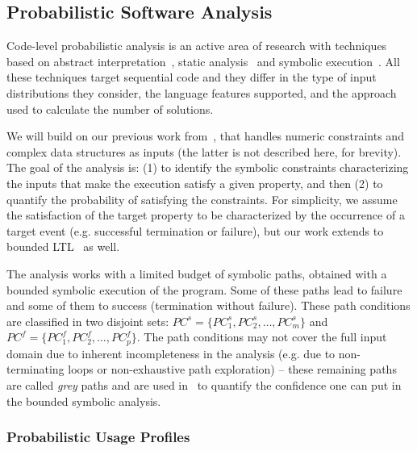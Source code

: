 \subsection{Probabilistic Software Analysis} 
Code-level probabilistic analysis is an active area of research with 
techniques based on abstract interpretation~\cite{Monniaux2000,CousotESOP12}, 
static analysis~\cite{adje-etal-vstte13,Rajamani1,Rajamani2} and symbolic
execution~\cite{ISSTA12,PLDI13}.  All these techniques target 
sequential code and they differ in the type of input
distributions they consider, the language features supported, and
the approach used to calculate the number of solutions.

We will build on our previous work
from~\cite{geldenhuys-etal-issta2012,filieri-etal-icse2013,Borges2014PLDI}, that handles numeric constraints and
complex data structures as inputs (the latter is not described here,
for brevity). The goal of the analysis is: (1) to identify the 
symbolic constraints characterizing the inputs that make the 
execution satisfy a given property, and then (2) to quantify the 
probability of satisfying the constraints.
For simplicity, we assume the satisfaction of the target property to be 
characterized by the occurrence of a target event (e.g. successful 
termination or failure), but our work extends to bounded 
LTL~\cite{Zuliani2010} as well. 


The analysis works with a limited budget of symbolic paths, obtained with a bounded symbolic execution of the program. 
 Some of these paths lead to
failure and some of them to success (termination without failure). 
These path conditions are classified in two disjoint sets: 
$\textit{PC}^s=\{\textit{PC}_1^s, 
\textit{PC}_2^s, \ldots , \textit{PC}_m^s\}$ and
$\textit{PC}^f=\{\textit{PC}_1^f, 
\textit{PC}_2^f, \ldots , \textit{PC}_p^f\}$.
The path conditions 
may not cover the full input domain due to inherent incompleteness in the analysis (e.g. due to non-terminating loops or non-exhaustive path exploration) -- these remaining paths are called  {\em grey} paths and are used in~\cite{filieri-etal-icse2013} to quantify the confidence one can put in the bounded symbolic analysis.

\subsubsection{Probabilistic Usage Profiles} 


